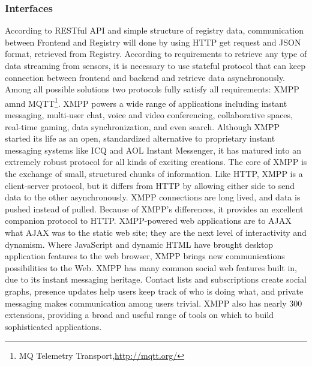     \subsubsection{Interfaces}
    According to RESTful API and simple structure of registry data, communication between Frontend and Registry will done by using HTTP get request and JSON format, retrieved from Registry.
    \newline
    According to requirements to retrieve any type of data streaming from sensors, it is necessary to use stateful protocol that can keep connection between frontend and backend and retrieve data asynchronously. Among all possible solutions two protocols fully satisfy all requirements: XMPP\cite{XMPPbook} amnd MQTT\footnote{MQ Telemetry Transport,\url{http://mqtt.org/}}.
    XMPP powers a wide range of applications including instant messaging, multi-user chat, voice and video conferencing, collaborative spaces, real-time gaming, data synchronization, and even search. Although XMPP started its life as an open, standardized alternative to proprietary instant messaging systems like ICQ and AOL Instant Messenger, it has matured into an extremely robust protocol for all kinds of exciting creations.
    \newline
    The core of XMPP is the exchange of small, structured chunks of information. Like HTTP, XMPP is a client-server protocol, but it differs from HTTP by allowing either side to send data to the other asynchronously. XMPP connections are long lived, and data is pushed instead of pulled. Because of XMPP’s differences, it provides an excellent companion protocol to HTTP. XMPP-powered web applications are to AJAX what AJAX was to the static web site; they are the next level of interactivity and dynamism. Where JavaScript and dynamic HTML have brought desktop application features to the web browser, XMPP brings new communications possibilities to the Web. XMPP has many common social web features built in, due to its instant messaging heritage. Contact lists and subscriptions create social graphs, presence updates help users keep track of who is doing what, and private messaging makes communication among users trivial. XMPP also has nearly 300 extensions, providing a broad and useful range of tools on which to build sophisticated applications. 
    \newline

